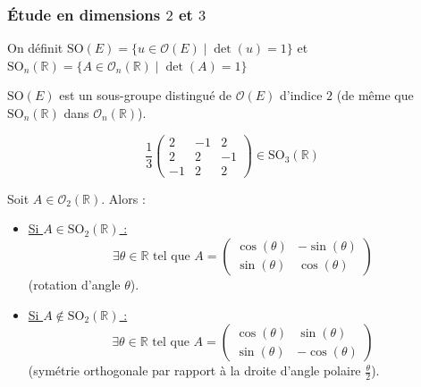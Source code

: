   \subsubsection{Étude en dimensions \texorpdfstring{$2$}{2} et \texorpdfstring{$3$}{3}}


  \begin{definition}
    On définit $\mathrm{SO}(E) = \{ u \in \mathcal{O}(E) \mid \det(u) = 1 \}$ et $\mathrm{SO}_n(\mathbb{R}) = \{ A \in \mathcal{O}_n(\mathbb{R}) \mid \det(A) = 1 \}$
  \end{definition}


  \begin{proposition}
    $\mathrm{SO}(E)$ est un sous-groupe distingué de $\mathcal{O}(E)$ d'indice $2$ (de même que $\mathrm{SO}_n(\mathbb{R})$ dans $\mathcal{O}_n(\mathbb{R})$).
  \end{proposition}


  \begin{example}
    \[ \frac{1}{3} \begin{pmatrix} 2 & -1 & 2 \\ 2 & 2 & -1 \\ -1 & 2 & 2 \end{pmatrix} \in \mathrm{SO}_3(\mathbb{R}) \]
  \end{example}

  \begin{theorem}
    Soit $A \in \mathcal{O}_2(\mathbb{R})$. Alors :
    \begin{itemize}
      \item \uline{Si $A \in \mathrm{SO}_2(\mathbb{R})$ :}
      \[ \exists \theta \in \mathbb{R} \text{ tel que } A = \begin{pmatrix} \cos(\theta) & -\sin(\theta) \\ \sin(\theta) & \cos(\theta) \end{pmatrix} \]
      (rotation d'angle $\theta$).
      \item \uline{Si $A \notin \mathrm{SO}_2(\mathbb{R})$ :}
      \[ \exists \theta \in \mathbb{R} \text{ tel que } A = \begin{pmatrix} \cos(\theta) & \sin(\theta) \\ \sin(\theta) & -\cos(\theta) \end{pmatrix} \]
      (symétrie orthogonale par rapport à la droite d'angle polaire $\frac{\theta}{2}$).
    \end{itemize}
  \end{theorem}

